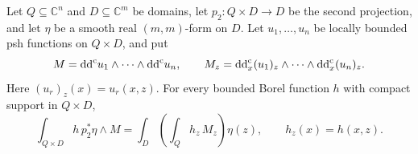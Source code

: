 \begin{lemma}\label{lma:boundedfibrefubini}
    Let $Q\subseteq\mathbb{C}^n$ and $D\subseteq\mathbb{C}^m$ be domains, let $p_2\colon Q\times D\to D$ be the second projection, and let $\eta$ be a smooth real $(m,m)$-form on $D$. Let $u_1,\ldots,u_n$ be locally bounded psh functions on $Q\times D$, and put
    \[
        M=\mathrm{dd}^{\mathrm{c}} u_1\wedge\cdots\wedge\mathrm{dd}^{\mathrm{c}} u_n,\qquad
        M_z=\mathrm{dd}^{\mathrm{c}}_x(u_1)_z\wedge\cdots\wedge\mathrm{dd}^{\mathrm{c}}_x(u_n)_z.
    \]
    Here $(u_r)_z(x)=u_r(x,z)$.
    For every bounded Borel function $h$ with compact support in $Q\times D$,
    \begin{equation}\label{eq:boundedfibrefubini}
        \int_{Q\times D}h\,p_2^*\eta\wedge M
        =\int_D\left(\int_Q h_z\,M_z\right)\eta(z),
        \qquad h_z(x)=h(x,z).
    \end{equation}
\end{lemma}
